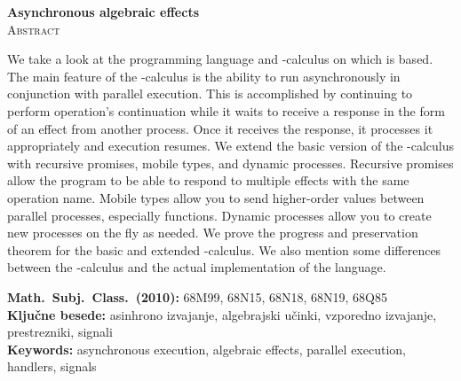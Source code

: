 \documentclass[12pt,a4paper,twoside]{article}
\newcommand{\kljucnebesede}{asinhrono izvajanje\sep algebrajski učinki\sep vzporedno izvajanje\sep prestrezniki\sep signali} %
\newcommand{\keywords}{asynchronous execution\sep algebraic effects\sep parallel execution\sep handlers\sep signals} %
\newcommand{\literatura}{literatura}  %
\newcommand{\sep}{, }  %
\theoremstyle{definition} %
\theoremstyle{plain} %
\numberwithin{equation}{section}  %
\begin{document}
\vfill
\begin{center}
\textbf{Asynchronous algebraic effects} \\[3mm] %
\textsc{Abstract}\\[2mm]
\end{center}
We take a look at the programming language \aeff{} and \lae{}-calculus on which \aeff{} is based. The main feature of the \lae-calculus is the ability to run asynchronously in conjunction with parallel execution.
This is accomplished by continuing to perform operation's continuation while it waits to receive a response in the form of an effect from another process. Once it receives the response, it processes it appropriately and execution resumes.
We extend the basic version of the \lae{}-calculus with recursive promises, mobile types, and dynamic processes.
Recursive promises allow the program to be able to respond to multiple effects with the same operation name.
Mobile types allow you to send higher-order values between parallel processes, especially functions.
Dynamic processes allow you to create new processes on the fly as needed.
We prove the progress and preservation theorem for the basic and extended \lae{}-calculus.
We also mention some differences between the \lae{}-calculus and the actual implementation of the \aeff{} language. 

\vfill\noindent
\textbf{Math.~Subj.~Class.~(2010):} 68M99, 68N15, 68N18, 68N19, 68Q85 \\[1mm]
\textbf{Ključne besede:} \kljucnebesede \\[1mm]
\textbf{Keywords:} \keywords

\cleardoublepage

\setcounter{page}{1}    %










%




\cleardoublepage                           %

\cleardoublepage                           %
\printindex
\end{document}
